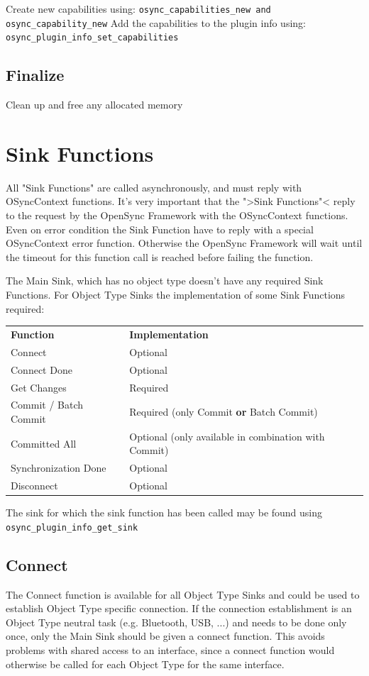 Create new capabilities using:
\verb|osync_capabilities_new and osync_capability_new|
Add the capabilities to the plugin info using:
\verb|osync_plugin_info_set_capabilities|
\subsection{Finalize}
Clean up and free any allocated memory
\section{Sink Functions}
All "Sink Functions" are called asynchronously, and must reply with OSyncContext functions.
 It's very important that the ">Sink Functions"< reply to the
request by the OpenSync Framework with the OSyncContext functions. Even on
error condition the Sink Function have to reply with a special OSyncContext
error function. Otherwise the OpenSync Framework will wait until the timeout for this
function call is reached before failing the function.

The Main Sink, which has no object type doesn't have any required Sink 
Functions. For Object Type Sinks the implementation of some Sink 
Functions required:

\begin{center}
\begin{tabular}{ll}
\textbf{Function} & \textbf{Implementation} \\ 
Connect & Optional \\
Connect Done & Optional \\
Get Changes & Required \\ 
Commit / Batch Commit & Required (only Commit \textbf{or} Batch Commit) \\ 
Committed All & Optional (only available in combination with Commit)\\ 
Synchronization Done & Optional \\ 
Disconnect & Optional
\end{tabular}
\end{center}

The sink for which the sink function has been called may be found using
\verb|osync_plugin_info_get_sink|

\subsection{Connect}
The Connect function is available for all Object Type Sinks and could be used to
establish Object Type specific connection. If the connection establishment is an
Object Type neutral task (e.g. Bluetooth, USB, ...) and needs to be done only
once, only the Main Sink should be given a connect function. This avoids
problems with shared access to an interface, since a connect function would
otherwise be called for each Object Type for the same interface.

